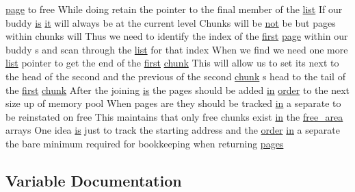 \begin{DoxyCompactItemize}
\hyperlink{notes_8txt_af75b9551a58e7c4fa475d037e21d2e46}{page} to free While doing retain the pointer to the final member of the \hyperlink{notes_8txt_a4ee6db26bad3dd738a9a0384595fe358}{list} If our buddy \hyperlink{notes_8txt_afdcba1605c13ab6a6a89a58079be00f2}{is} \hyperlink{notes_8txt_a4ce567c95a3c0db618dea1cb3c81173b}{it} will always be at the current level Chunks will be \hyperlink{notes_8txt_ac0c86bc9d520a3d319a4c5083848fab9}{not} be but pages within chunks will Thus we need to identify the index of the \hyperlink{notes_8txt_accf77c448218df9fd25c4423d2869fba}{first} \hyperlink{notes_8txt_af75b9551a58e7c4fa475d037e21d2e46}{page} within our buddy s and scan through the \hyperlink{notes_8txt_a4ee6db26bad3dd738a9a0384595fe358}{list} for that index When we find we need one more \hyperlink{notes_8txt_a4ee6db26bad3dd738a9a0384595fe358}{list} pointer to get the end of the \hyperlink{notes_8txt_accf77c448218df9fd25c4423d2869fba}{first} \hyperlink{notes_8txt_a60c3f3ea1420be8254648913cbf8b336}{chunk} This will allow us to set its next to the head of the second and the previous of the second \hyperlink{notes_8txt_a60c3f3ea1420be8254648913cbf8b336}{chunk} s head to the tail of the \hyperlink{notes_8txt_accf77c448218df9fd25c4423d2869fba}{first} \hyperlink{notes_8txt_a60c3f3ea1420be8254648913cbf8b336}{chunk} After the joining \hyperlink{notes_8txt_afdcba1605c13ab6a6a89a58079be00f2}{is} the pages should be added \hyperlink{simulator_8c_aca392a8d3941cd0740aef3ad92545d67}{in} \hyperlink{notes_8txt_ae170b788b9ce36849b8a92724a029135}{order} to the next size up of memory pool When pages are they should be tracked \hyperlink{simulator_8c_aca392a8d3941cd0740aef3ad92545d67}{in} a separate to be reinstated on free This maintains that only free chunks exist \hyperlink{simulator_8c_aca392a8d3941cd0740aef3ad92545d67}{in} the \hyperlink{buddy_8c_a6d390a89d1f6c149cef6284d2c0351df}{free\+\_\+area} arrays One idea \hyperlink{notes_8txt_afdcba1605c13ab6a6a89a58079be00f2}{is} just to track the starting address and the \hyperlink{notes_8txt_ae170b788b9ce36849b8a92724a029135}{order} \hyperlink{simulator_8c_aca392a8d3941cd0740aef3ad92545d67}{in} a separate the bare minimum required for bookkeeping when returning \hyperlink{notes_8txt_a591847dfa4e8c250a8c08a63e5063001}{pages}
\end{DoxyCompactItemize}


\subsection{Variable Documentation}
